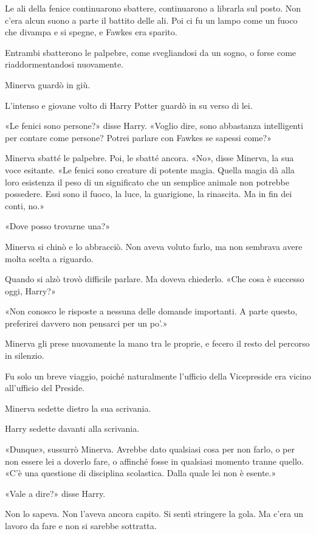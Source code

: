 Le ali della fenice continuarono sbattere, continuarono a librarla sul posto. Non c’era alcun suono a parte il battito delle ali. Poi ci fu un lampo come un fuoco che divampa e si spegne, e Fawkes era sparito.

Entrambi sbatterono le palpebre, come svegliandosi da un sogno, o forse come riaddormentandosi nuovamente.

Minerva guardò in giù.

L’intenso e giovane volto di Harry Potter guardò in su verso di lei.

«Le fenici sono persone?» disse Harry. «Voglio dire, sono abbastanza intelligenti per contare come persone? Potrei parlare con Fawkes se sapessi come?»

Minerva sbatté le palpebre. Poi, le sbatté ancora. «No», disse Minerva, la sua voce esitante. «Le fenici sono creature di potente magia. Quella magia dà alla loro esistenza il peso di un significato che un semplice animale non potrebbe possedere. Essi sono il fuoco, la luce, la guarigione, la rinascita. Ma in fin dei conti, no.»

«Dove posso trovarne una?»

Minerva si chinò e lo abbracciò. Non aveva voluto farlo, ma non sembrava avere molta scelta a riguardo.

Quando si alzò trovò difficile parlare. Ma doveva chiederlo. «Che cosa è successo oggi, Harry?»

«Non conosco le risposte a nessuna delle domande importanti. A parte questo, preferirei davvero non pensarci per un po’.»

Minerva gli prese nuovamente la mano tra le proprie, e fecero il resto del percorso in silenzio.

Fu solo un breve viaggio, poiché naturalmente l’ufficio della Vicepreside era vicino all’ufficio del Preside.

Minerva sedette dietro la sua scrivania.

Harry sedette davanti alla scrivania.

«Dunque», sussurrò Minerva. Avrebbe dato qualsiasi cosa per non farlo, o per non essere lei a doverlo fare, o affinché fosse in qualsiasi momento tranne quello. «C’è una questione di disciplina scolastica. Dalla quale lei non è esente.»

«Vale a dire?» disse Harry.

Non lo sapeva. Non l’aveva ancora capito. Si sentì stringere la gola. Ma c’era un lavoro da fare e non si sarebbe sottratta.

